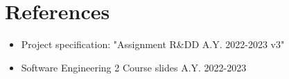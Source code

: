 \documentclass[12pt]{article}
\begin{document}
\newpage
\section{References}
\begin{itemize}
    \item Project specification: "Assignment R\&DD A.Y. 2022-2023 v3"
    \item Software Engineering 2 Course slides A.Y. 2022-2023
\end{itemize}
\end{document}
